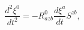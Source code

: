 \begin{equation}
\frac{d^{2}\xi ^{0}}{dt^{2}}=-R_{azb}^{0}\frac{d\xi ^{a}}{dt}S^{zb},
\label{42}
\end{equation}


